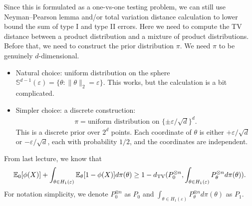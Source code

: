 \documentclass[11pt,letterpaper]{article}
\newcounter{lecture}
\numberwithin{theorem}{lecture}
\numberwithin{proposition}{lecture}
\numberwithin{lemma}{lecture}
\numberwithin{claim}{lecture}
\numberwithin{corollary}{lecture}
\numberwithin{definition}{lecture}
\numberwithin{conjecture}{lecture}
\numberwithin{remark}{lecture}
\numberwithin{example}{lecture}
\numberwithin{equation}{lecture}
\begin{document}
Since this is formulated as a one-vs-one testing problem, we can still use Neyman--Pearson lemma and/or total variation distance calculation to lower bound the sum of type I and type II errors. Here we need to compute the TV distance between a product distribution and a mixture of product distributions. Before that, we need to construct the prior distribution $\pi$. We need $\pi$ to be genuinely $d$-dimensional.
\begin{itemize}
  \item Natural choice: uniform distribution on the sphere $\mathbb{S}^{d-1} (\varepsilon) = \{\theta: \|\theta\|_2 = \varepsilon\}$. This works, but the calculation is a bit complicated.
  \item Simpler choice: a discrete construction:
  \begin{align*}
    \pi = \text{uniform distribution on } \{\pm \varepsilon / \sqrt{d}\}^d.
  \end{align*}
  This is a discrete prior over $2^d$ points. Each coordinate of $\theta$ is either $+\varepsilon / \sqrt{d}$ or $-\varepsilon / \sqrt{d}$, each with probability $1/2$, and the coordinates are independent.
\end{itemize}
From last lecture, we know that
\begin{align*}
  {\mathbb{E}}_0 [\phi (X)] + \int_{\theta \in H_1 (\varepsilon)} {\mathbb{E}}_\theta [1 - \phi (X)] d\pi (\theta) \geq 1 - d_{\mathrm{TV}} (P_0^{\otimes n}, \int_{\theta \in H_1 (\varepsilon)} P_\theta^{\otimes n} d\pi (\theta)).
\end{align*}
For notation simplicity, we denote $P_0^{\otimes n}$ as $P_0$ and $\int_{\theta \in H_1 (\varepsilon)} P_\theta^{\otimes n} d\pi (\theta)$ as $P_1$.
\end{document}
